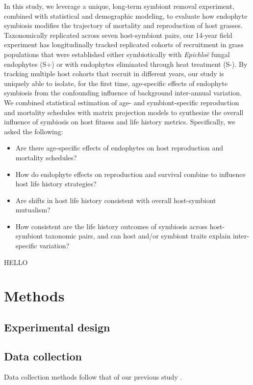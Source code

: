 \documentclass[11pt]{article}
\begin{document}
In this study, we leverage a unique, long-term symbiont removal experiment, combined with statistical and demographic modeling, to evaluate how endophyte symbiosis modifies the trajectory of mortality and reproduction of host grasses. 
Taxonomically replicated across seven host-symbiont pairs, our 14-year field experiment has longitudinally tracked replicated cohorts of recruitment in grass populations that were established either symbiotically with \textit{Epichlo\"{e}} fungal endophytes (S+) or with endophytes eliminated through heat treatment (S-). 
By tracking multiple host cohorts that recruit in different years, our study is uniquely able to isolate, for the first time, age-specific effects of endophyte symbiosis from the confounding influence of background inter-annual variation. 
We combined statistical estimation of age- and symbiont-specific reproduction and mortality schedules with matrix projection models to synthesize the overall influence of symbiosis on host fitness and life history metrics. 
Specifically, we asked the following:
\begin{itemize}
	\item Are there age-specific effects of endophytes on host reproduction and mortality schedules?
	\item How do endophyte effects on reproduction and survival combine to influence host life history strategies?
	\item Are shifts in host life history consistent with overall host-symbiont mutualism?
	\item How consistent are the life history outcomes of symbiosis across host-symbiont taxonomic pairs, and can host and/or symbiont traits explain inter-specific variation?
\end{itemize}


HELLO


\section*{Methods}
\subsection*{Experimental design}

\subsection*{Data collection}
Data collection methods follow that of our previous study \citep{fowler2024microbial}. 
\end{document}
